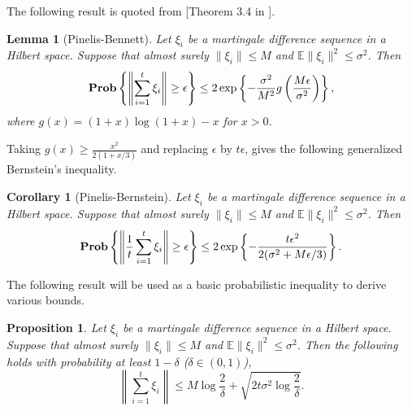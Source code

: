 \documentclass[twoside,11pt]{amsart}
\theoremstyle{theorem}
\newtheorem{lem}[thm]{Lemma}
\newtheorem{prop}[thm]{Proposition}
\newtheorem{cor}[thm]{Corollary}
\theoremstyle{definition}
\theoremstyle{remark}
\def\E{{\mathbb E}}        %
\def\Prob{{\bf Prob}}
\begin{document}
The following result is quoted from [Theorem 3.4 in ].

\begin{lem}[Pinelis-Bennett]
Let $\xi_i$ be a martingale difference sequence in a Hilbert space. Suppose that almost surely $\|\xi_i\|\leq M$ and $\E \|\xi_i\|^2 \leq \sigma^2$.
Then
\[ \Prob \left\{ \left\|\sum_{i=1}^t \xi_i \right\| \geq \epsilon \right\} \leq
2 \exp \left\{-\frac{\sigma^2}{M^2} g \left(\frac{M\epsilon}{\sigma^2} \right) \right\}, \]
where $g(x) = (1+x)\log(1+x)-x$ for $x>0$.
\end{lem}

Taking $g(x)\geq \frac{x^2}{2(1+x/3)}$ and replacing $\epsilon$ by $t\epsilon$, gives the following generalized Bernstein's inequality.

\begin{cor}[Pinelis-Bernstein]
Let $\xi_i$ be a martingale difference sequence in a Hilbert space. Suppose that almost surely $\|\xi_i\|\leq M$ and $\E \|\xi_i\|^2 \leq \sigma^2$.
Then
\begin{equation} \label{eq:bernstein}
\Prob \left\{ \left\|\frac{1}{t}\sum_{i=1}^t \xi_i \right\| \geq \epsilon \right\} \leq
2 \exp \left\{-\frac{t\epsilon^2}{2(\sigma^2+M\epsilon/3)} \right\}.
\end{equation}
\end{cor}

The following result will be used as a basic probabilistic inequality to derive various bounds. 

\begin{prop} \label{prop:bernstein}
Let $\xi_i$ be a martingale difference sequence in a Hilbert space. Suppose that almost surely $\|\xi_i\|\leq M$ and $\E \|\xi_i\|^2 \leq \sigma^2$.
Then the following holds with probability at least $1-\delta$ ($\delta\in (0,1)$),
\[ \left\|\sum_{i=1}^t \xi_i \right\| \leq M \log\frac{2}{\delta} + \sqrt{2t\sigma^2 \log\frac{2}{\delta}}.   \]
\end{prop}
\end{document}
